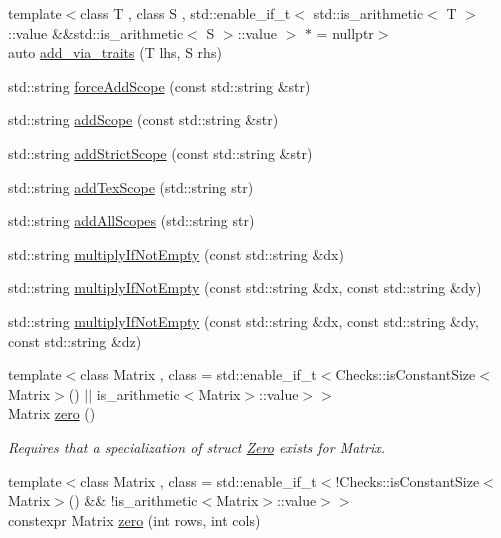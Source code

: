 \begin{DoxyCompactItemize}
\item 
{\footnotesize template$<$class T , class S , std\-::enable\-\_\-if\-\_\-t$<$ std\-::is\-\_\-arithmetic$<$ T $>$\-::value \&\&std\-::is\-\_\-arithmetic$<$ S $>$\-::value $>$ $\ast$  = nullptr$>$ }\\auto \hyperlink{namespaceFunG_a6cbaa3b1b61e5834b38db5c831e3c25e}{add\-\_\-via\-\_\-traits} (T lhs, S rhs)
\item 
std\-::string \hyperlink{namespaceFunG_ab53219fedaf7327fc9a4672f1d2eb2f9}{force\-Add\-Scope} (const std\-::string \&str)
\item 
std\-::string \hyperlink{namespaceFunG_a5dbb2eda96a2ba227a25bf4d5fdd45b7}{add\-Scope} (const std\-::string \&str)
\item 
std\-::string \hyperlink{namespaceFunG_aab80cce1c3236f9056ff38ffe0649e9a}{add\-Strict\-Scope} (const std\-::string \&str)
\item 
std\-::string \hyperlink{namespaceFunG_a87878f850f8f115f4e7b6de21cdde6dc}{add\-Tex\-Scope} (std\-::string str)
\item 
std\-::string \hyperlink{namespaceFunG_a6740837e0a42b7968c15d005890ae5f7}{add\-All\-Scopes} (std\-::string str)
\item 
std\-::string \hyperlink{namespaceFunG_a502b373ca98741d24c2375f5a6fc9773}{multiply\-If\-Not\-Empty} (const std\-::string \&dx)
\item 
std\-::string \hyperlink{namespaceFunG_a0111473091231d0560392df37c771d26}{multiply\-If\-Not\-Empty} (const std\-::string \&dx, const std\-::string \&dy)
\item 
std\-::string \hyperlink{namespaceFunG_a2df36bba8d082bdd76604be66ae94f26}{multiply\-If\-Not\-Empty} (const std\-::string \&dx, const std\-::string \&dy, const std\-::string \&dz)
\item 
{\footnotesize template$<$class Matrix , class  = std\-::enable\-\_\-if\-\_\-t$<$\-Checks\-::is\-Constant\-Size$<$\-Matrix$>$() $\vert$$\vert$ is\-\_\-arithmetic$<$\-Matrix$>$\-::value$>$$>$ }\\Matrix \hyperlink{namespaceFunG_a649b4470d6def401959bfea3a368c48c}{zero} ()
\begin{DoxyCompactList}\small\item\em Requires that a specialization of struct \hyperlink{structFunG_1_1Zero}{Zero} exists for Matrix. \end{DoxyCompactList}\item 
{\footnotesize template$<$class Matrix , class  = std\-::enable\-\_\-if\-\_\-t$<$!\-Checks\-::is\-Constant\-Size$<$\-Matrix$>$() \&\& !is\-\_\-arithmetic$<$\-Matrix$>$\-::value$>$$>$ }\\constexpr Matrix \hyperlink{namespaceFunG_ae633433339ba30207aa526e54e3924b4}{zero} (int rows, int cols)

\end{DoxyCompactItemize}
